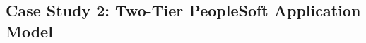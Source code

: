 \documentclass[journal,twocolumn,9.5pt]{IEEEtran}
\begin{document}

\subsection{Case Study 2: Two-Tier PeopleSoft Application Model}
\end{document}
